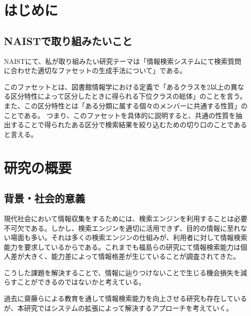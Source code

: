 \documentclass[a4j,10pt, twocolumn]{jarticle} \usepackage[dvipdfmx]{graphicx} \usepackage{amssymb} \usepackage{amsmath}
\begin{document}
\section{はじめに}
\subsection{NAISTで取り組みたいこと}
NAISTにて、私が取り組みたい研究テーマは「情報検索システムにて検索質問に合わせた適切なファセットの生成手法について」である。

このファセットとは、図書館情報学における定義で「あるクラスを2以上の異なる区分特性によって区分したときに得られる下位クラスの総体\cite{libdic}」のことを言う。
また、この区分特性とは「ある分類に属する個々のメンバーに共通する性質」のことである。
つまり、このファセットを具体的に説明すると、共通の性質を抽出することで得られたある区分で検索結果を絞り込むための切り口のことであると言える。
\section{研究の概要}
\subsection{背景・社会的意義}
 現代社会において情報収集をするためには、検索エンジンを利用することは必要不可欠である。しかし、検索エンジンを適切に活用できず、目的の情報に至れない場面も多い。それは多くの検索エンジンの仕組みが、利用者に対して情報検索能力を要求しているからである。これまでも福島らの研究にて情報検索能力は個人差が大きく、能力差によって情報格差が生じていることが調査されてきた\cite{fukushima}。

 こうした課題を解決することで、情報に辿りつけないことで生じる機会損失を減らすことができるのではないかと考えている。
 
 過去に齋藤らによる教育を通して情報検索能力を向上させる研究\cite{saito}も存在しているが、本研究ではシステムの拡張によって解決するアプローチを考えていく。
\end{document}
